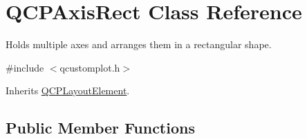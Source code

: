 \hypertarget{class_q_c_p_axis_rect}{\section{Q\-C\-P\-Axis\-Rect Class Reference}
\label{class_q_c_p_axis_rect}
}


Holds multiple axes and arranges them in a rectangular shape.  




{\ttfamily \#include $<$qcustomplot.\-h$>$}



Inherits \hyperlink{class_q_c_p_layout_element}{Q\-C\-P\-Layout\-Element}.

\subsection*{Public Member Functions}
